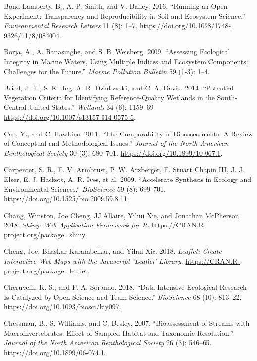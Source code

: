 \documentclass[fleqn,10pt,lineno]{wlpeerj} %
\begin{document}
\leavevmode\hypertarget{ref-BondLamberty16}{}%
Bond-Lamberty, B., A. P. Smith, and V. Bailey. 2016. ``Running an Open Experiment: Transparency and Reproducibility in Soil and Ecosystem Science.'' \emph{Environmental Research Letters} 11 (8): 1--7. \url{https://doi.org/10.1088/1748-9326/11/8/084004}.

\leavevmode\hypertarget{ref-Borja09}{}%
Borja, A., A. Ranasinghe, and S. B. Weisberg. 2009. ``Assessing Ecological Integrity in Marine Waters, Using Multiple Indices and Ecosystem Components: Challenges for the Future.'' \emph{Marine Pollution Bulletin} 59 (1-3): 1--4.

\leavevmode\hypertarget{ref-Bried14}{}%
Bried, J. T., S. K. Jog, A. R. Dzialowski, and C. A. Davis. 2014. ``Potential Vegetation Criteria for Identifying Reference-Quality Wetlands in the South-Central United States.'' \emph{Wetlands} 34 (6): 1159--69. \url{https://doi.org/10.1007/s13157-014-0575-5}.

\leavevmode\hypertarget{ref-Cao11}{}%
Cao, Y., and C. Hawkins. 2011. ``The Comparability of Bioassessments: A Review of Conceptual and Methodological Issues.'' \emph{Journal of the North American Benthological Society} 30 (3): 680--701. \url{https://doi.org/10.1899/10-067.1}.

\leavevmode\hypertarget{ref-Carpenter09}{}%
Carpenter, S. R., E. V. Armbrust, P. W. Arzberger, F. Stuart Chapin III, J. J. Elser, E. J. Hackett, A. R. Ives, et al. 2009. ``Accelerate Synthesis in Ecology and Environmental Sciences.'' \emph{BioScience} 59 (8): 699--701. \url{https://doi.org/10.1525/bio.2009.59.8.11}.

\leavevmode\hypertarget{ref-Chang18}{}%
Chang, Winston, Joe Cheng, JJ Allaire, Yihui Xie, and Jonathan McPherson. 2018. \emph{Shiny: Web Application Framework for R}. \url{https://CRAN.R-project.org/package=shiny}.

\leavevmode\hypertarget{ref-Cheng18}{}%
Cheng, Joe, Bhaskar Karambelkar, and Yihui Xie. 2018. \emph{Leaflet: Create Interactive Web Maps with the Javascript 'Leaflet' Library}. \url{https://CRAN.R-project.org/package=leaflet}.

\leavevmode\hypertarget{ref-Cheruvelil18}{}%
Cheruvelil, K. S., and P. A. Soranno. 2018. ``Data-Intensive Ecological Research Is Catalyzed by Open Science and Team Science.'' \emph{BioScience} 68 (10): 813--22. \url{https://doi.org/10.1093/biosci/biy097}.

\leavevmode\hypertarget{ref-Chessman07}{}%
Chessman, B., S. Williams, and C. Besley. 2007. ``Bioassessment of Streams with Macroinvertebrates: Effect of Sampled Habitat and Taxonomic Resolution.'' \emph{Journal of the North American Benthological Society} 26 (3): 546--65. \url{https://doi.org/10.1899/06-074.1}.
\end{document}
